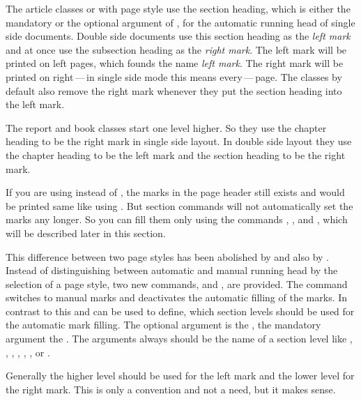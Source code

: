The article classes
 or  with page style
 use the section heading, which
is either the mandatory or the optional argument of , for the
automatic running head of single side documents. Double side documents use
this section heading as the \emph{left mark} and at once use the subsection
heading as the \emph{right mark}. The left mark will be printed on left pages,
which founds the name \emph{left mark}. The right mark will be printed on
right\,---\,in single side mode this means every\,---\,page. The classes by
default also remove the right mark whenever they put the section heading into
the left mark.

The report and book classes  start one level
higher. So they use the chapter heading to be the right mark in single side
layout. In double side layout they use the chapter heading to be the left mark
and the section heading to be the right mark.

If you are using  instead of
, the marks in the page header
still exists and would be printed same like using . But
section commands will not automatically set the marks any longer. So you can
fill them only using the commands , , and
, which will be described later in this section.

This difference between two page styles has been abolished by
 and also by . Instead of distinguishing
between automatic and manual running head by the selection of a page style,
two new commands,  and , are provided. The
command  switches to manual marks and deactivates the
automatic filling of the marks. In contrast to this  and
 can be used to define, which section levels should be used
for the automatic mark filling. The optional argument is the , the mandatory argument the . The arguments always should be the name of a section level
like , , , ,
, , or .

Generally the higher level should be used for the left mark and the lower
level for the right mark. This is only a convention and not a need, but it
makes sense.

